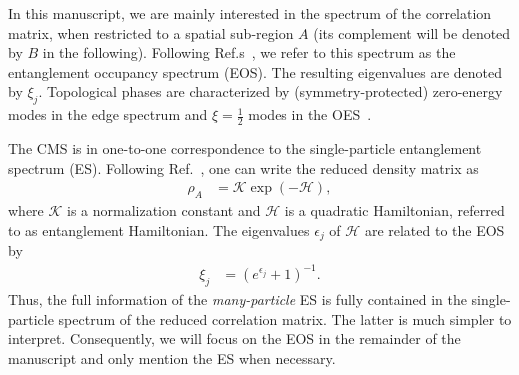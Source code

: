 \documentclass[twocolumn,amsmath,longbibliography,amssymb,superscriptaddress]{revtex4-1}
\newcommand{\mariac}[1]{{\it\color{cyan}#1}}
\begin{document}
In this manuscript, we are mainly interested in the spectrum of the correlation matrix, when restricted to a spatial sub-region $A$ (its complement will be denoted by $B$ in the following). 
Following Ref.s~\cite{Huang2012,Huang2012-2}, we refer to this spectrum as the entanglement occupancy spectrum (EOS). 
The resulting eigenvalues  are denoted by $\xi_j$. 
Topological phases are characterized by (symmetry-protected) zero-energy modes in the edge spectrum and $\xi=\frac 1 2$ modes in the OES~\cite{Fidkowski2010entanglement}.
 

The CMS is in one-to-one correspondence to the single-particle entanglement spectrum (ES). 
Following Ref.~\cite{Peschel2008}, one can write the  reduced density matrix as 
\begin{align}\label{eq:red_dens_mat}
\rho_A&=\mathcal{K} \exp(-\mathcal H),
\end{align}
where $\mathcal{K}$ is a normalization constant and $\mathcal{H}$ is a quadratic Hamiltonian, referred to as entanglement Hamiltonian. 
The eigenvalues $\epsilon_j$ of $\mathcal{H}$ are related to the EOS by 
\begin{align}
\xi_j &=\left(e^{\epsilon_j}+1\right)^{-1}. 
\end{align}
Thus, the full information of the \emph{many-particle} ES is fully contained in the single-particle spectrum of the reduced correlation matrix. 
The latter is much simpler to interpret. 
Consequently, we will focus on the EOS in the remainder of the manuscript and only mention the ES when necessary. 

\end{document}
